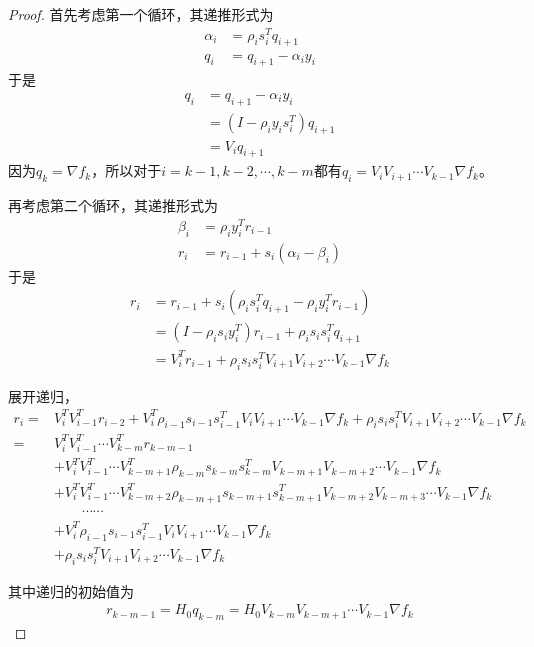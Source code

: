 \documentclass{article}
\begin{document}
\begin{proof}
    首先考虑第一个循环，其递推形式为
    \begin{align*}
        \alpha_i &= \rho_is_i^Tq_{i+1}\\
        q_i &= q_{i+1} - \alpha_iy_i
    \end{align*}
    于是
    \begin{align*}
        q_{i}&=q_{i+1}-\alpha_iy_i\\
        &=(I-\rho_iy_is_i^T)q_{i+1}\\
        &=V_iq_{i+1}
    \end{align*}
    因为$q_{k}=\nabla f_k$，所以对于$i=k-1,k-2,\cdots,k-m$都有$q_i=V_{i}V_{i+1}\cdots V_{k-1}\nabla f_k$。

    再考虑第二个循环，其递推形式为
    \begin{align*}
        \beta_i &= \rho_iy_i^Tr_{i-1}\\
        r_{i} &= r_{i-1}+s_i(\alpha_i-\beta_i)
    \end{align*}
    于是
    \begin{align*}
        r_i &= r_{i-1}+s_i(\rho_is_i^Tq_{i+1}-\rho_iy_i^Tr_{i-1})\\
        &= (I-\rho_is_iy_i^T)r_{i-1}+\rho_is_is_i^Tq_{i+1}\\
        &= V_i^Tr_{i-1}+\rho_is_is_i^TV_{i+1}V_{i+2}\cdots V_{k-1}\nabla f_k
    \end{align*}

    展开递归，
    \begin{align*}
        r_i
        =& V_i^TV_{i-1}^Tr_{i-2}+V_i^T\rho_{i-1}s_{i-1}s_{i-1}^TV_{i}V_{i+1}\cdots V_{k-1}\nabla f_k+\rho_is_is_i^TV_{i+1}V_{i+2}\cdots V_{k-1}\nabla f_k\\
        =& V_i^TV_{i-1}^T\cdots V_{k-m}^Tr_{k-m-1}\\
        &+V_i^TV_{i-1}^T\cdots V_{k-m+1}^T\rho_{k-m}s_{k-m}s_{k-m}^TV_{k-m+1}V_{k-m+2}\cdots V_{k-1}\nabla f_k\\
        &+V_i^TV_{i-1}^T\cdots V_{k-m+2}^T\rho_{k-m+1}s_{k-m+1}s_{k-m+1}^TV_{k-m+2}V_{k-m+3}\cdots V_{k-1}\nabla f_k\\
        &\quad\quad\cdots\cdots\\
        &+V_i^T\rho_{i-1}s_{i-1}s_{i-1}^TV_{i}V_{i+1}\cdots V_{k-1}\nabla f_k\\
        &+\rho_is_is_i^TV_{i+1}V_{i+2}\cdots V_{k-1}\nabla f_k
    \end{align*}

    其中递归的初始值为
    \begin{align*}
        r_{k-m-1} = H_0q_{k-m} =H_0V_{k-m}V_{k-m+1}\cdots V_{k-1}\nabla f_k
    \end{align*}


\end{proof}
\end{document}
